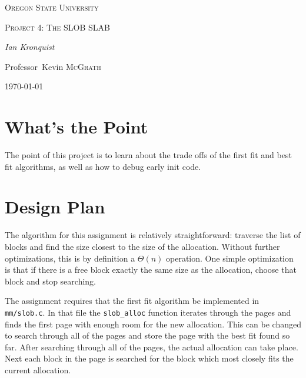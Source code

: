 \documentclass[10pt,conference,draftclsnofoot,onecolumn]{IEEEtran}
\begin{document}
\begin{titlepage}
    \centering
    {\scshape\LARGE Oregon State University \par}
    \vspace{1cm}
    {\scshape\Large Project 4: The SLOB SLAB \par}
    \vspace{2cm}
    {\Large\itshape Ian Kronquist \par}
    \vfill
    \par
    Professor~Kevin \textsc{McGrath}

    \vfill

    {\large \today\par}
\end{titlepage}


\author{
}

\bigskip


\section{What's the Point}
The point of this project is to learn about the trade offs of the first fit and best fit algorithms, as well as how to debug early init code.

\section{Design Plan}
The algorithm for this assignment is relatively straightforward: traverse the list of blocks and find the size closest to the size of the allocation. Without further optimizations, this is by definition a $\Theta(n)$ operation. One simple optimization is that if there is a free block exactly the same size as the allocation, choose that block and stop searching.

The assignment requires that the first fit algorithm be implemented in \texttt{mm/slob.c}. In that file the \texttt{slob\_alloc} function iterates through the pages and finds the first page with enough room for the new allocation. This can be changed to search through all of the pages and store the page with the best fit found so far. After searching through all of the pages, the actual allocation can take place. Next each block in the page is searched for the block which most closely fits the current allocation.
\end{document}
